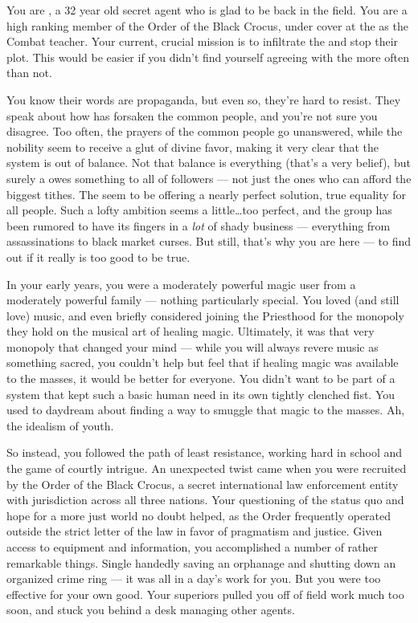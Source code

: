 \documentclass[char]{GL2020}
\begin{document}
\name{\cInterpol{}}

You are \cInterpol{\intro}, a 32 year old secret agent who is glad to be back in the field. You are a high ranking member of the Order of the Black Crocus, under cover at the \pSchool{} as the Combat teacher. Your current, crucial mission is to infiltrate the \pGoaties{} and stop their plot. This would be easier if you didn't find yourself agreeing with the \pGoaties{} more often than not.

You know their words are propaganda, but even so, they're hard to resist. They speak about how \cFarmGod{\intro} has forsaken the common people, and you're not sure you disagree. Too often, the prayers of the common people go unanswered, while the nobility seem to receive a glut of divine favor, making it very clear that the system is out of balance. Not that balance is everything (that's a very \pShippie{} belief), but surely a \cFarmGod{\God} owes something to all of \cFarmGod{\their} followers — not just the ones who can afford the biggest tithes. The \pGoaties{} seem to be offering a nearly perfect solution, true equality for all people. Such a lofty ambition seems a little\ldots{}too perfect, and the group has been rumored to have its fingers in a \emph{lot} of shady business — everything from assassinations to black market curses. But still, that's why you are here — to find out if it really is too good to be true.

In your early years, you were a moderately powerful magic user from a moderately powerful family — nothing particularly special. You loved (and still love) music, and even briefly considered joining the Priesthood for the monopoly they hold on the musical art of healing magic. Ultimately, it was that very monopoly that changed your mind — while you will always revere music as something sacred, you couldn't help but feel that if healing magic was available to the masses, it would be better for everyone. You didn't want to be part of a system that kept such a basic human need in its own tightly clenched fist. You used to daydream about finding a way to smuggle that magic to the masses. Ah, the idealism of youth. 

So instead, you followed the path of least resistance, working hard in school and the game of courtly intrigue. An unexpected twist came when you were recruited by the Order of the Black Crocus, a secret international law enforcement entity with jurisdiction across all three nations. Your questioning of the status quo and hope for a more just world no doubt helped, as the Order frequently operated outside the strict letter of the law in favor of pragmatism and justice. Given access to equipment and information, you accomplished a number of rather remarkable things. Single handedly saving an orphanage and shutting down an organized crime ring — it was all in a day's work for you. But you were too effective for your own good. Your superiors pulled you off of field work much too soon, and stuck you behind a desk managing other agents.
\end{document}
